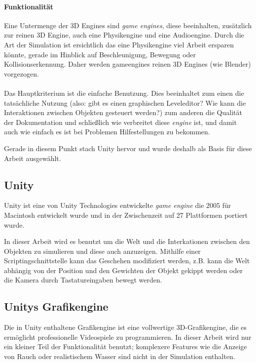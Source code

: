\documentclass[
    12pt,
    bibliography=totoc,
    ngerman
]{scrartcl}
\begin{document}
\paragraph{Funktionalit{\"{a}}t} Eine Untermenge der 3D Engines sind \textit{game engines}, diese beeinhalten, zus{\"{a}}tzlich zur reinen 3D Engine, auch eine Physikengine und eine Audioengine.
Durch die Art der Simulation ist ersichtlich das eine Physikengine viel Arbeit ersparen k{\"{o}}nnte, gerade im Hinblick auf Beschleunigung, Bewegung oder Kollisionserkennung. Daher werden gameengines reinen 3D Engines (wie Blender) vorgezogen.

\paragraph{} Das Hauptkriterium ist die einfache Benutzung. Dies beeinhaltet zum einen die
tats{\"{a}}chliche Nutzung (also: gibt es einen graphischen Leveleditor? Wie kann die Interaktionen zwischen
Objekten gesteuert werden?) zum anderen die Qualit{\"{a}}t der Dokumentation und schließlich wie verbreitet diese
\textit{engine} ist, und damit auch wie einfach es ist bei Problemen Hilfestellungen zu bekommen.

Gerade in diesem Punkt stach Unity hervor und wurde deshalb als Basis f{\"{u}}r diese Arbeit ausgew{\"{a}}hlt.

\subsection{Unity}
Unity ist eine von Unity Technologies entwickelte \textit{game engine} die 2005 f{\"{u}}r Macintosh entwickelt wurde und in der Zwischenzeit auf 27 Plattformen portiert wurde.

In dieser Arbeit wird es benutzt um die Welt und die Interkationen zwischen den Objekten zu simulieren und diese auch anzuzeigen. Mithilfe einer Scriptingschnittstelle kann das Geschehen modifiziert werden, z.B. kann die Welt
abh{\"{a}}ngig von der Position und den Gewichten der Objekt gekippt werden oder die Kamera durch Tastatureingaben bewegt werden.

\subsection{Unitys Grafikengine}
Die in Unity enthaltene Grafikengine ist eine vollwertige 3D-Grafikengine, die es erm{\"{o}}glicht professionelle Videospiele zu programmieren. In dieser Arbeit wird nur
ein kleiner Teil der Funktionalit{\"{a}}t benutzt; komplexere Features wie die Anzeige von Rauch oder realistischem Wasser sind nicht in der Simulation enthalten.
\end{document}
